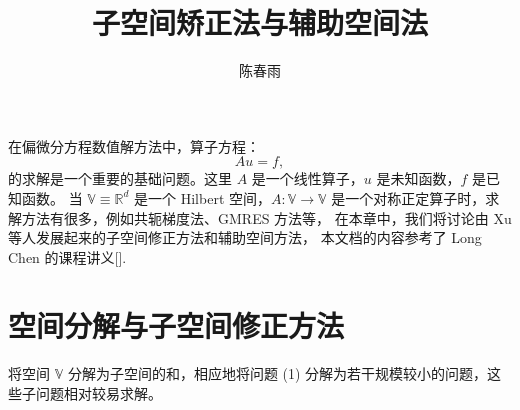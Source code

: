 \documentclass[letterpaper,12pt]{article}
\title{子空间矫正法与辅助空间法}
\author{陈春雨}
\date{}
\begin{document}
\maketitle
在偏微分方程数值解方法中，算子方程：
\begin{equation}
    Au = f,
\end{equation}
的求解是一个重要的基础问题。这里 $A$ 是一个线性算子，$u$ 是未知函数，$f$
是已知函数。
当 $\mathbb{V} \equiv \mathbb{R}^d$ 
是一个 Hilbert 空间，$A : \mathbb{V} \to \mathbb{V}$
是一个对称正定算子时，求解方法有很多，例如共轭梯度法、GMRES
方法等，
在本章中，我们将讨论由 Xu 等人发展起来的子空间修正方法和辅助空间方法，
本文档的内容参考了 Long Chen 的课程讲义[].

\section{空间分解与子空间修正方法}

将空间 $\mathbb{V}$ 分解为子空间的和，相应地将问题 (1) 分解为若干规模较小的问题，这些子问题相对较易求解。
\end{document}
